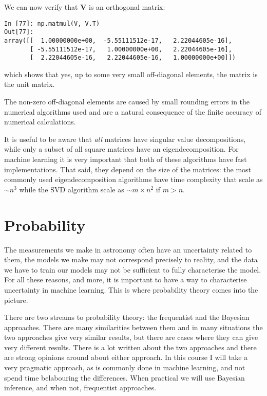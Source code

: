 \documentclass[a4paper,10pt]{article}
\begin{document}
We can now verify that $\mathbf{V}$ is an orthogonal matrix:

\begin{lstlisting}
In [77]: np.matmul(V, V.T)
Out[77]: 
array([[  1.00000000e+00,  -5.55111512e-17,   2.22044605e-16],
       [ -5.55111512e-17,   1.00000000e+00,   2.22044605e-16],
       [  2.22044605e-16,   2.22044605e-16,   1.00000000e+00]])

\end{lstlisting}

which shows that yes, up to some very small off-diagonal elements, the matrix is the unit matrix.

The non-zero off-diagonal elements are caused by small rounding errors in the numerical algorithms used and are a natural consequence of the finite accuracy of numerical calculations.

It is useful to be aware that \emph{all} matrices have singular value decompositions, while only a subset of all square matrices have an eigendecomposition. For machine learning it is very important that both of these algorithms have fast implementations.  That said, they depend on the size of the matrices: the most commonly used eigendecomposition algorithms have time complexity that scale as $\sim n^3$ while the SVD algorithm scale as $\sim m\times n^2$ if $m>n$.



\section{ Probability}

The measurements we make in astronomy often have an uncertainty related to them,  the models we make may not correspond precisely to reality, and the data we have to train our models may not be sufficient to fully characterise the model. For all these reasons, and more, it is important to have a way to characterise uncertainty in machine learning. This is where probability theory comes into the picture.

There are two streams to probability theory: the frequentist and the Bayesian approaches. There are many similarities between them and in many situations the two approaches give very similar results, but there are cases where they can give very different results. There is a lot written about the two approaches and there are strong opinions around about either approach. In this course I will take a very pragmatic approach, as is commonly done in machine learning, and not spend time belabouring the differences. When practical we will use Bayesian inference, and when not, frequentist approaches.
\end{document}
